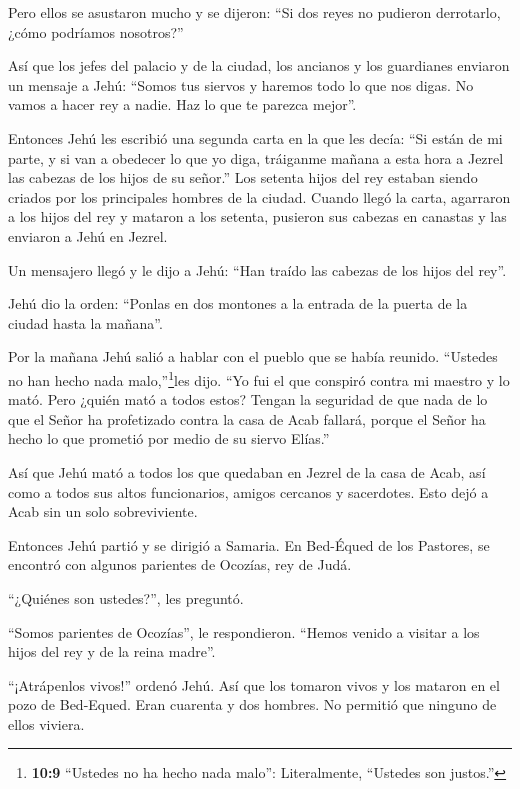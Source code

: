  Pero ellos se asustaron mucho y se dijeron: ``Si dos reyes
no pudieron derrotarlo, ¿cómo podríamos nosotros?''

 Así que los jefes del palacio y de la ciudad, los ancianos
y los guardianes enviaron un mensaje a Jehú: ``Somos tus siervos y
haremos todo lo que nos digas. No vamos a hacer rey a nadie. Haz lo que
te parezca mejor''.

 Entonces Jehú les escribió una segunda carta en la que les
decía: ``Si están de mi parte, y si van a obedecer lo que yo diga,
tráiganme mañana a esta hora a Jezrel las cabezas de los hijos de su
señor.'' Los setenta hijos del rey estaban siendo criados por los
principales hombres de la ciudad.  Cuando llegó la carta,
agarraron a los hijos del rey y mataron a los setenta, pusieron sus
cabezas en canastas y las enviaron a Jehú en Jezrel.

 Un mensajero llegó y le dijo a Jehú: ``Han traído las
cabezas de los hijos del rey''.

Jehú dio la orden: ``Ponlas en dos montones a la entrada de la puerta de
la ciudad hasta la mañana''.

 Por la mañana Jehú salió a hablar con el pueblo que se
había reunido. ``Ustedes no han hecho nada malo,''\footnote{\textbf{10:9}
  ``Ustedes no ha hecho nada malo'': Literalmente, ``Ustedes son
  justos.''}les dijo. ``Yo fui el que conspiró contra mi maestro y lo
mató. Pero ¿quién mató a todos estos?  Tengan la seguridad
de que nada de lo que el Señor ha profetizado contra la casa de Acab
fallará, porque el Señor ha hecho lo que prometió por medio de su siervo
Elías.''

 Así que Jehú mató a todos los que quedaban en Jezrel de la
casa de Acab, así como a todos sus altos funcionarios, amigos cercanos y
sacerdotes. Esto dejó a Acab sin un solo sobreviviente.

 Entonces Jehú partió y se dirigió a Samaria. En Bed-Équed
de los Pastores,  se encontró con algunos parientes de
Ocozías, rey de Judá.

``¿Quiénes son ustedes?'', les preguntó.

``Somos parientes de Ocozías'', le respondieron. ``Hemos venido a
visitar a los hijos del rey y de la reina madre''.

 ``¡Atrápenlos vivos!'' ordenó Jehú. Así que los tomaron
vivos y los mataron en el pozo de Bed-Equed. Eran cuarenta y dos
hombres. No permitió que ninguno de ellos viviera.


